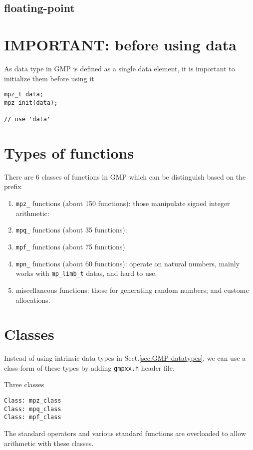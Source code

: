\subsection{floating-point}



\section{IMPORTANT: before using data}

As data type in GMP is defined as a single data element, it is important to
initialize them before using it
\begin{verbatim}
mpz_t data;
mpz_init(data);

// use 'data'
\end{verbatim}


\section{Types of functions}

There are 6 classes of functions in GMP which can be distinguish based on the
prefix
\begin{enumerate}
  \item \verb!mpz_! functions (about 150 functions): those manipulate signed
  integer arithmetic:
  
  \item \verb!mpq_! functions (about 35 functions): 
  
  \item \verb!mpf_! functions (about 75 functions)
  
  \item \verb!mpn_! functions (about 60 functions):
  operate on natural numbers, mainly works with \verb!mp_limb_t! datas, and hard
  to use.
  
  
  \item miscellaneous functions: those for generating random numbers; and
  custome allocations.
\end{enumerate}

\section{Classes}

Instead of using intrinsic data types in Sect.\ref{sec:GMP-datatypes}, we can
use a class-form of these types by adding \verb!gmpxx.h! header file.

Three classes
\begin{verbatim}
Class: mpz_class
Class: mpq_class
Class: mpf_class
\end{verbatim}
The standard operators and various standard functions are overloaded to allow
arithmetic with these classes.

